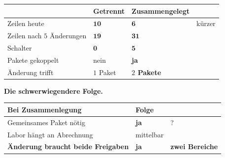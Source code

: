 \begin{merksatz}
\begin{center}
{\small
\renewcommand{\arraystretch}{1.45}
\begin{tabular}{@{}P{3.0cm}P{1.8cm}P{2.4cm}P{1.6cm}@{}}
\toprule
& \textbf{Getrennt} & \textbf{Zusammen\-gelegt} & \\
\midrule
Zeilen heute & $\mathbf{10}$ & $\mathbf{6}$ & \textcolor{gruen}{kürzer}\\
Zeilen nach $5$ Änderungen & $\mathbf{19}$ & \textcolor{akzent}{$\mathbf{31}$} & \\
Schalter & $\mathbf{0}$ & \textcolor{akzent}{$\mathbf{5}$} & \\
Pakete gekoppelt & \textcolor{gruen}{nein} & \textcolor{akzent}{\textbf{ja}} & \\
Änderung trifft & $1$ Paket & \textcolor{akzent}{\textbf{$2$ Pakete}} & \\
\bottomrule
\end{tabular}}
\end{center}

\begin{center}
\begin{minipage}{0.88\textwidth}
\end{minipage}
\end{center}

\textbf{Die schwerwiegendere Folge.}

\begin{center}
\renewcommand{\arraystretch}{1.45}
\begin{tabular}{@{}P{3.0cm}P{2.2cm}P{2.6cm}@{}}
\toprule
\textbf{Bei Zusammenlegung} & \textbf{Folge} & \\
\midrule
Gemeinsames Paket nötig & \textcolor{akzent}{\textbf{ja}} & ?\\
Labor hängt an Abrechnung & \textcolor{akzent}{mittelbar} & \\
\textbf{Änderung braucht beide Freigaben} & \textcolor{akzent}{\textbf{ja}} & \textcolor{akzent}{\textbf{zwei Bereiche}}\\
\bottomrule
\end{tabular}
\end{center}

\begin{center}
\end{center}
\end{merksatz}

